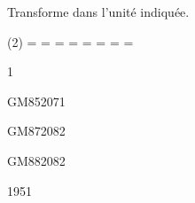 \documentclass[a4paper,11pt]{report}
\begin{document}
\begin{exop}
{
Transforme dans l'unité indiquée.
\begin{tasks}[after-item-skip=0.3em](2)
    \task {}= \dotfill \hspace{0.3cm}
     \hspace{0.3cm}
    \task {} = \dotfill \hspace{0.3cm}
     \hspace{0.3cm}
  \task {}= \dotfill \hspace{0.3cm}
    \tunit{}{\m} \hspace{0.3cm}
    \task {}= \dotfill \hspace{0.3cm}
    \tunit{}{\tonne} \hspace{0.3cm}
     \task {}= \dotfill \hspace{0.3cm}
     \hspace{0.3cm}
     \task {}= \dotfill \hspace{0.3cm}
     \hspace{0.3cm}
     \task {}= \dotfill \hspace{0.3cm}
     \hspace{0.3cm}
     \task {}= \dotfill \hspace{0.3cm}
     \hspace{0.3cm}
\end{tasks} 
}
{1}
\end{exop}



\begin{exof}{GM85}{207}{1}
\end{exof}


\begin{exof}{GM87}{208}{2}
\end{exof}


\begin{exof}{GM88}{208}{2}
\end{exof}

\begin{FLP}{195}{1}
\end{FLP}
\end{document}
